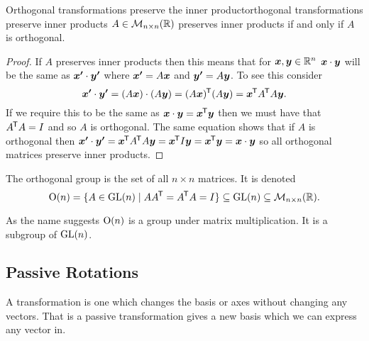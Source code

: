 \begin{corollary}{Orthogonal transformations preserve the inner product}{orthogonal transformations preserve inner products}
    \(A\in\mathcal{M}_{{n}\times{n}}({\mathbb{R}})\) preserves inner products if and only if \(A\) is orthogonal.
\end{corollary}
\begin{proof}
    If \(A\) preserves inner products then this means that for \(\bm{x}, \bm{y}\in\mathbb{R}^n\) \(\bm{x}\cdot\bm{y}\) will be the same as \(\bm{x'}\cdot\bm{y'}\) where \(\bm{x'} = A\bm{x}\) and \(\bm{y'} = A\bm{y}\).
    To see this consider
    \[\bm{x'}\cdot\bm{y'} = (A\bm{x})\cdot(A\bm{y}) = (A\bm{x})^{\mkern-1.5mu\mathsf{T}} (A\bm{y}) = \bm{x}^{\mkern-1.5mu\mathsf{T}} A^{\mkern-1.5mu\mathsf{T}} A \bm{y}.\]
    If we require this to be the same as \(\bm{x}\cdot\bm{y} = \bm{x}^{\mkern-1.5mu\mathsf{T}}\bm{y}\) then we must have that \(A^{\mkern-1.5mu\mathsf{T}} A = I\) and so \(A\) is orthogonal.
    The same equation shows that if \(A\) is orthogonal then \(\bm{x'}\cdot\bm{y'} = \bm{x}^{\mkern-1.5mu\mathsf{T}} A^{\mkern-1.5mu\mathsf{T}} A \bm{y} = \bm{x}^{\mkern-1.5mu\mathsf{T}} I \bm{y} = \bm{x}^{\mkern-1.5mu\mathsf{T}}\bm{y} = \bm{x}\cdot\bm{y}\) so all orthogonal matrices preserve inner products.
\end{proof}

\begin{notation*}{}
    The orthogonal group is the set of all \(n\times n\) matrices.
    It is denoted
    \[\mathrm{O}(n) = \{A\in\mathrm{GL}(n)\mid AA^{\mkern-1.5mu\mathsf{T}} = A^{\mkern-1.5mu\mathsf{T}} A = I\} \subseteq \mathrm{GL}(n) \subseteq \mathcal{M}_{{n}\times{n}}({\mathbb{R}}).\]
\end{notation*}
As the name suggests \(\mathrm{O}(n)\) is a group under matrix multiplication.
It is a subgroup of \(\mathrm{GL}(n)\).

\subsection{Passive Rotations}
A  transformation is one which changes the basis or axes without changing any vectors.
That is a passive transformation gives a new basis which we can express any vector in.

